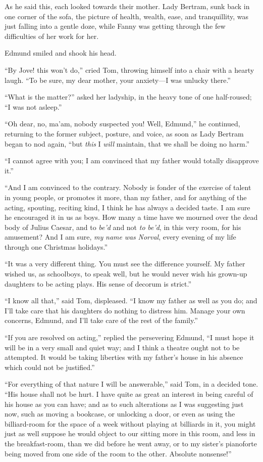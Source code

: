 \documentclass{article}
\begin{document}
As he said this, each looked towards their mother.
Lady Bertram, sunk back in one corner of the sofa,
the picture of health, wealth, ease, and tranquillity,
was just falling into a gentle doze, while Fanny was getting
through the few difficulties of her work for her.

Edmund smiled and shook his head.

``By Jove! this won't do,'' cried Tom, throwing himself into
a chair with a hearty laugh.  ``To be sure, my dear mother,
your anxiety---I was unlucky there.''

``What is the matter?'' asked her ladyship, in the heavy
tone of one half-roused; ``I was not asleep.''

``Oh dear, no, ma'am, nobody suspected you!  Well, Edmund,''
he continued, returning to the former subject, posture,
and voice, as soon as Lady Bertram began to nod again,
``but \emph{this} I \emph{will} maintain, that we shall be doing
no harm.''

``I cannot agree with you; I am convinced that my father
would totally disapprove it.''

``And I am convinced to the contrary.  Nobody is fonder of
the exercise of talent in young people, or promotes it more,
than my father, and for anything of the acting, spouting,
reciting kind, I think he has always a decided taste.
I am sure he encouraged it in us as boys.  How many a time
have we mourned over the dead body of Julius Caesar,
and to \emph{be'd} and not \emph{to} \emph{be'd}, in this very room,
for his amusement?  And I am sure, \emph{my} \emph{name} \emph{was} \emph{Norval},
every evening of my life through one Christmas holidays.''

``It was a very different thing.  You must see the
difference yourself.  My father wished us, as schoolboys,
to speak well, but he would never wish his grown-up
daughters to be acting plays.  His sense of decorum is strict.''

``I know all that,'' said Tom, displeased.  ``I know my father
as well as you do; and I'll take care that his daughters
do nothing to distress him.  Manage your own concerns,
Edmund, and I'll take care of the rest of the family.''

``If you are resolved on acting,'' replied the persevering Edmund,
``I must hope it will be in a very small and quiet way;
and I think a theatre ought not to be attempted.
It would be taking liberties with my father's house
in his absence which could not be justified.''

``For everything of that nature I will be answerable,''
said Tom, in a decided tone.  ``His house shall not be hurt.
I have quite as great an interest in being careful
of his house as you can have; and as to such alterations
as I was suggesting just now, such as moving a bookcase,
or unlocking a door, or even as using the billiard-room
for the space of a week without playing at billiards in it,
you might just as well suppose he would object to our sitting
more in this room, and less in the breakfast-room, than
we did before he went away, or to my sister's pianoforte
being moved from one side of the room to the other.
Absolute nonsense!''
\end{document}

